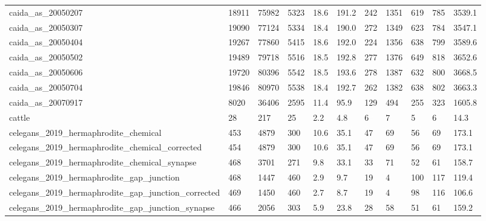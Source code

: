\begin{longtable}{lllllllllll}
 caida\_as\_20050207                                  & 18911      & 75982     & 5323  & 18.6   & 191.2  & 242   & 1351   & 619    & 785    & 3539.1  \\
 caida\_as\_20050307                                  & 19090      & 77124     & 5334  & 18.4   & 190.0  & 272   & 1349   & 623    & 784    & 3547.1  \\
 caida\_as\_20050404                                  & 19267      & 77860     & 5415  & 18.6   & 192.0  & 224   & 1356   & 638    & 799    & 3589.6  \\
 caida\_as\_20050502                                  & 19489      & 79718     & 5516  & 18.5   & 192.8  & 277   & 1376   & 649    & 818    & 3652.6  \\
 caida\_as\_20050606                                  & 19720      & 80396     & 5542  & 18.5   & 193.6  & 278   & 1387   & 632    & 800    & 3668.5  \\
 caida\_as\_20050704                                  & 19846      & 80970     & 5538  & 18.4   & 192.7  & 262   & 1382   & 638    & 802    & 3663.3  \\
 caida\_as\_20070917                                  & 8020       & 36406     & 2595  & 11.4   & 95.9   & 129   & 494    & 255    & 323    & 1605.8  \\
 cattle                                             & 28         & 217       & 25    & 2.2    & 4.8    & 6     & 7      & 5      & 6      & 14.3    \\
 celegans\_2019\_hermaphrodite\_chemical               & 453        & 4879      & 300   & 10.6   & 35.1   & 47    & 69     & 56     & 69     & 173.1   \\
 celegans\_2019\_hermaphrodite\_chemical\_corrected     & 454        & 4879      & 300   & 10.6   & 35.1   & 47    & 69     & 56     & 69     & 173.1   \\
 celegans\_2019\_hermaphrodite\_chemical\_synapse       & 468        & 3701      & 271   & 9.8    & 33.1   & 33    & 71     & 52     & 61     & 158.7   \\
 celegans\_2019\_hermaphrodite\_gap\_junction           & 468        & 1447      & 460   & 2.9    & 9.7    & 19    & 4      & 100    & 117    & 119.4   \\
 celegans\_2019\_hermaphrodite\_gap\_junction\_corrected & 469        & 1450      & 460   & 2.7    & 8.7    & 19    & 4      & 98     & 116    & 106.6   \\
 celegans\_2019\_hermaphrodite\_gap\_junction\_synapse   & 466        & 2056      & 303   & 5.9    & 23.8   & 28    & 58     & 51     & 61     & 159.2   \\

\end{longtable}
